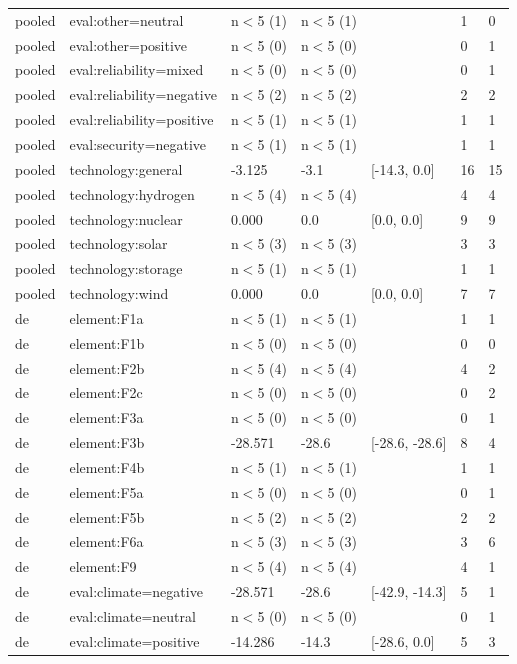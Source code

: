 \begin{table}[htbp]
\begin{tabular}{lllllll}
pooled & eval:other=neutral & n$<$5 (1) & n$<$5 (1) &  & 1 & 0 \\
pooled & eval:other=positive & n$<$5 (0) & n$<$5 (0) &  & 0 & 1 \\
pooled & eval:reliability=mixed & n$<$5 (0) & n$<$5 (0) &  & 0 & 1 \\
pooled & eval:reliability=negative & n$<$5 (2) & n$<$5 (2) &  & 2 & 2 \\
pooled & eval:reliability=positive & n$<$5 (1) & n$<$5 (1) &  & 1 & 1 \\
pooled & eval:security=negative & n$<$5 (1) & n$<$5 (1) &  & 1 & 1 \\
pooled & technology:general & -3.125 & -3.1 & [-14.3, 0.0] & 16 & 15 \\
pooled & technology:hydrogen & n$<$5 (4) & n$<$5 (4) &  & 4 & 4 \\
pooled & technology:nuclear & 0.000 & 0.0 & [0.0, 0.0] & 9 & 9 \\
pooled & technology:solar & n$<$5 (3) & n$<$5 (3) &  & 3 & 3 \\
pooled & technology:storage & n$<$5 (1) & n$<$5 (1) &  & 1 & 1 \\
pooled & technology:wind & 0.000 & 0.0 & [0.0, 0.0] & 7 & 7 \\
de & element:F1a & n$<$5 (1) & n$<$5 (1) &  & 1 & 1 \\
de & element:F1b & n$<$5 (0) & n$<$5 (0) &  & 0 & 0 \\
de & element:F2b & n$<$5 (4) & n$<$5 (4) &  & 4 & 2 \\
de & element:F2c & n$<$5 (0) & n$<$5 (0) &  & 0 & 2 \\
de & element:F3a & n$<$5 (0) & n$<$5 (0) &  & 0 & 1 \\
de & element:F3b & -28.571 & -28.6 & [-28.6, -28.6] & 8 & 4 \\
de & element:F4b & n$<$5 (1) & n$<$5 (1) &  & 1 & 1 \\
de & element:F5a & n$<$5 (0) & n$<$5 (0) &  & 0 & 1 \\
de & element:F5b & n$<$5 (2) & n$<$5 (2) &  & 2 & 2 \\
de & element:F6a & n$<$5 (3) & n$<$5 (3) &  & 3 & 6 \\
de & element:F9 & n$<$5 (4) & n$<$5 (4) &  & 4 & 1 \\
de & eval:climate=negative & -28.571 & -28.6 & [-42.9, -14.3] & 5 & 1 \\
de & eval:climate=neutral & n$<$5 (0) & n$<$5 (0) &  & 0 & 1 \\
de & eval:climate=positive & -14.286 & -14.3 & [-28.6, 0.0] & 5 & 3 \\

\end{tabular}
\end{table}

